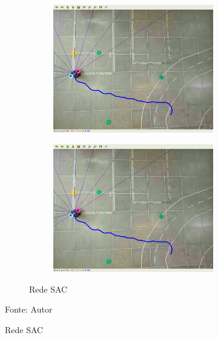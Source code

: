 \begin{figure}[H]
\begin{center}
\begin{subfigure}[b]{0.60\textwidth}
\begin{subfigure}[b]{0.24\textwidth}
            \includegraphics[width=\textwidth]{imagens/real_envs/real_env1_sac/7.png}
        \end{subfigure}
        \hfill
        \begin{subfigure}[b]{0.24\textwidth}
            \includegraphics[width=\textwidth]{imagens/real_envs/real_env1_sac/7.png}
        \end{subfigure}
        \caption{Rede SAC}
        \label{subfig:real_env1_sac}
    \end{subfigure}
    \label{fig:real_env1_frames}
    \end{center}
\small{Fonte: Autor}
\end{figure}

